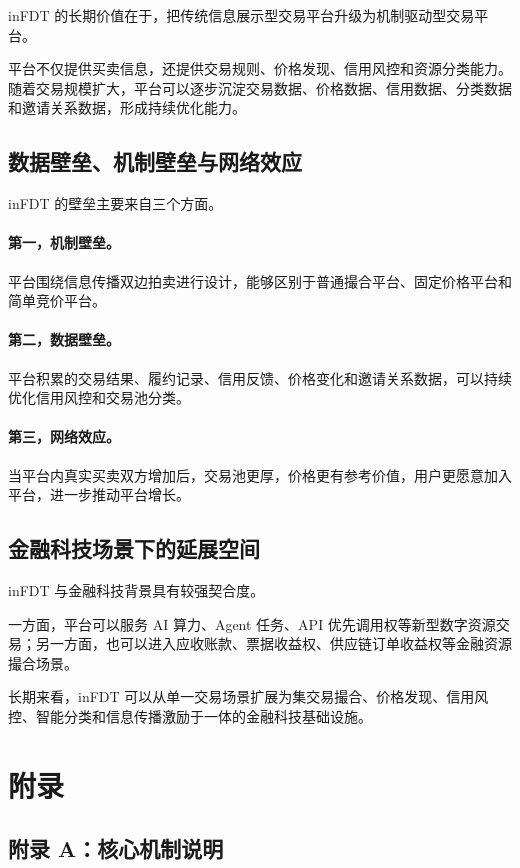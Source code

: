 \documentclass[UTF8,a4paper,12pt]{ctexart}
\begin{document}
inFDT 的长期价值在于，把传统信息展示型交易平台升级为机制驱动型交易平台。

平台不仅提供买卖信息，还提供交易规则、价格发现、信用风控和资源分类能力。随着交易规模扩大，平台可以逐步沉淀交易数据、价格数据、信用数据、分类数据和邀请关系数据，形成持续优化能力。

\subsection{数据壁垒、机制壁垒与网络效应}

inFDT 的壁垒主要来自三个方面。

\paragraph{第一，机制壁垒。}
平台围绕信息传播双边拍卖进行设计，能够区别于普通撮合平台、固定价格平台和简单竞价平台。

\paragraph{第二，数据壁垒。}
平台积累的交易结果、履约记录、信用反馈、价格变化和邀请关系数据，可以持续优化信用风控和交易池分类。

\paragraph{第三，网络效应。}
当平台内真实买卖双方增加后，交易池更厚，价格更有参考价值，用户更愿意加入平台，进一步推动平台增长。

\subsection{金融科技场景下的延展空间}

inFDT 与金融科技背景具有较强契合度。

一方面，平台可以服务 AI 算力、Agent 任务、API 优先调用权等新型数字资源交易；另一方面，也可以进入应收账款、票据收益权、供应链订单收益权等金融资源撮合场景。

长期来看，inFDT 可以从单一交易场景扩展为集交易撮合、价格发现、信用风控、智能分类和信息传播激励于一体的金融科技基础设施。

\section{附录}

\subsection{附录 A：核心机制说明}
\end{document}
